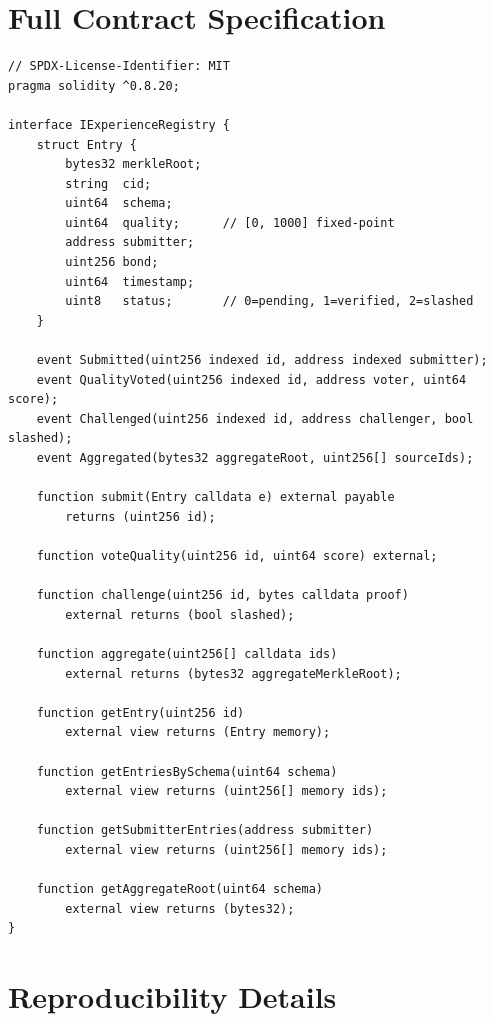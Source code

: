 \documentclass[11pt]{article}
\begin{document}
\section{Full Contract Specification}
\label{app:contract}

\begin{verbatim}
// SPDX-License-Identifier: MIT
pragma solidity ^0.8.20;

interface IExperienceRegistry {
    struct Entry {
        bytes32 merkleRoot;
        string  cid;
        uint64  schema;
        uint64  quality;      // [0, 1000] fixed-point
        address submitter;
        uint256 bond;
        uint64  timestamp;
        uint8   status;       // 0=pending, 1=verified, 2=slashed
    }

    event Submitted(uint256 indexed id, address indexed submitter);
    event QualityVoted(uint256 indexed id, address voter, uint64 score);
    event Challenged(uint256 indexed id, address challenger, bool slashed);
    event Aggregated(bytes32 aggregateRoot, uint256[] sourceIds);

    function submit(Entry calldata e) external payable
        returns (uint256 id);

    function voteQuality(uint256 id, uint64 score) external;

    function challenge(uint256 id, bytes calldata proof)
        external returns (bool slashed);

    function aggregate(uint256[] calldata ids)
        external returns (bytes32 aggregateMerkleRoot);

    function getEntry(uint256 id)
        external view returns (Entry memory);

    function getEntriesBySchema(uint64 schema)
        external view returns (uint256[] memory ids);

    function getSubmitterEntries(address submitter)
        external view returns (uint256[] memory ids);

    function getAggregateRoot(uint64 schema)
        external view returns (bytes32);
}
\end{verbatim}

\section{Reproducibility Details}
\label{app:reproducibility}
\end{document}
